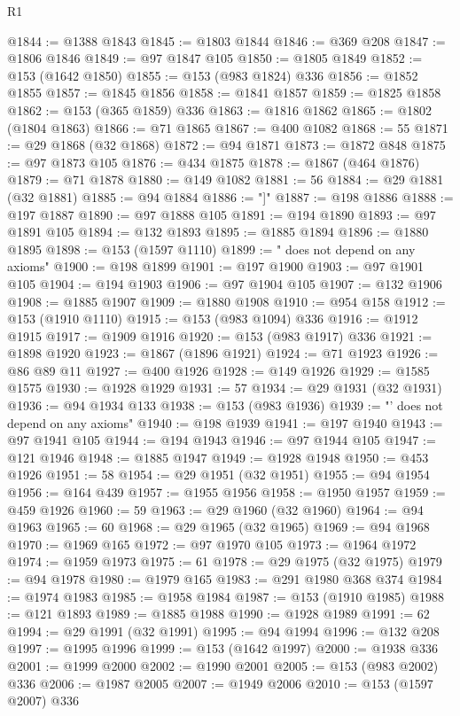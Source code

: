 \begin{lexlean}{R1}
\begin{coremodule}
{{{{{{{{{{{{{{{{{{{{{{{{{{{{{{{{{{{{{{{{{{{{{{{{{{{{{{{{{{{{{{{{{{{{{{{{{{{{{{{{{{{{{{{{{{{{{{{{{{{{{{{{{{{{{{{{{{{{{{{{{{{{{{{{{{{{{{{{{{{{{{{{{{{{{{{{{{{{{{{{{{{{{{{{{{{{{{{{{{{{{{{{{{@1844 := @1388 @1843
@1845 := @1803 @1844
@1846 := @369 @208
@1847 := @1806 @1846
@1849 := @97 @1847 @105
@1850 := @1805 @1849
@1852 := @153 (@1642 @1850)
@1855 := @153 (@983 @1824) @336
@1856 := @1852 @1855
@1857 := @1845 @1856
@1858 := @1841 @1857
@1859 := @1825 @1858
@1862 := @153 (@365 @1859) @336
@1863 := @1816 @1862
@1865 := @1802 (@1804 @1863)
@1866 := @71 @1865
@1867 := @400 @1082
@1868 := 55
@1871 := @29 @1868 (@32 @1868)
@1872 := @94 @1871
@1873 := @1872 @848
@1875 := @97 @1873 @105
@1876 := @434 @1875
@1878 := @1867 (@464 @1876)
@1879 := @71 @1878
@1880 := @149 @1082
@1881 := 56
@1884 := @29 @1881 (@32 @1881)
@1885 := @94 @1884
@1886 := "]"
@1887 := @198 @1886
@1888 := @197 @1887
@1890 := @97 @1888 @105
@1891 := @194 @1890
@1893 := @97 @1891 @105
@1894 := @132 @1893
@1895 := @1885 @1894
@1896 := @1880 @1895
@1898 := @153 (@1597 @1110)
@1899 := " does not depend on any axioms"
@1900 := @198 @1899
@1901 := @197 @1900
@1903 := @97 @1901 @105
@1904 := @194 @1903
@1906 := @97 @1904 @105
@1907 := @132 @1906
@1908 := @1885 @1907
@1909 := @1880 @1908
@1910 := @954 @158
@1912 := @153 (@1910 @1110)
@1915 := @153 (@983 @1094) @336
@1916 := @1912 @1915
@1917 := @1909 @1916
@1920 := @153 (@983 @1917) @336
@1921 := @1898 @1920
@1923 := @1867 (@1896 @1921)
@1924 := @71 @1923
@1926 := @86 @89 @11
@1927 := @400 @1926
@1928 := @149 @1926
@1929 := @1585 @1575
@1930 := @1928 @1929
@1931 := 57
@1934 := @29 @1931 (@32 @1931)
@1936 := @94 @1934 @133
@1938 := @153 (@983 @1936)
@1939 := "' does not depend on any axioms"
@1940 := @198 @1939
@1941 := @197 @1940
@1943 := @97 @1941 @105
@1944 := @194 @1943
@1946 := @97 @1944 @105
@1947 := @121 @1946
@1948 := @1885 @1947
@1949 := @1928 @1948
@1950 := @453 @1926
@1951 := 58
@1954 := @29 @1951 (@32 @1951)
@1955 := @94 @1954
@1956 := @164 @439
@1957 := @1955 @1956
@1958 := @1950 @1957
@1959 := @459 @1926
@1960 := 59
@1963 := @29 @1960 (@32 @1960)
@1964 := @94 @1963
@1965 := 60
@1968 := @29 @1965 (@32 @1965)
@1969 := @94 @1968
@1970 := @1969 @165
@1972 := @97 @1970 @105
@1973 := @1964 @1972
@1974 := @1959 @1973
@1975 := 61
@1978 := @29 @1975 (@32 @1975)
@1979 := @94 @1978
@1980 := @1979 @165
@1983 := @291 @1980 @368 @374
@1984 := @1974 @1983
@1985 := @1958 @1984
@1987 := @153 (@1910 @1985)
@1988 := @121 @1893
@1989 := @1885 @1988
@1990 := @1928 @1989
@1991 := 62
@1994 := @29 @1991 (@32 @1991)
@1995 := @94 @1994
@1996 := @132 @208
@1997 := @1995 @1996
@1999 := @153 (@1642 @1997)
@2000 := @1938 @336
@2001 := @1999 @2000
@2002 := @1990 @2001
@2005 := @153 (@983 @2002) @336
@2006 := @1987 @2005
@2007 := @1949 @2006
@2010 := @153 (@1597 @2007) @336
}}}}}}}}}}}}}}}}}}}}}}}}}}}}}}}}}}}}}}}}}}}}}}}}}}}}}}}}}}}}}}}}}}}}}}}}}}}}}}}}}}}}}}}}}}}}}}}}}}}}}}}}}}}}}}}}}}}}}}}}}}}}}}}}}}}}}}}}}}}}}}}}}}}}}}}}}}}}}}}}}}}}}}}}}}}}}}}}}}}}}}}}}}
\end{coremodule}
\end{lexlean}

